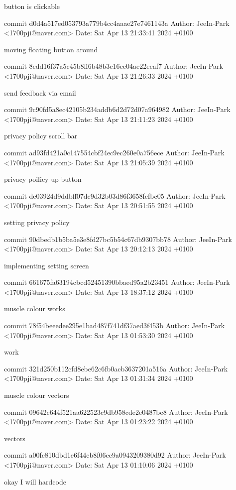    button is clickable

commit d0d4a517ed053793a779b4cc4aaae27e7461143a
Author: JeeIn-Park <1700pji@naver.com>
Date:   Sat Apr 13 21:33:41 2024 +0100

    moving floating button around

commit 8cdd16f37a5c45b8ff6b48b3c16ec04ae22ecaf7
Author: JeeIn-Park <1700pji@naver.com>
Date:   Sat Apr 13 21:26:33 2024 +0100

    send feedback via email

commit 9c90fd5a8ec42105b234addb6d2d72d07a964982
Author: JeeIn-Park <1700pji@naver.com>
Date:   Sat Apr 13 21:11:23 2024 +0100

    privacy policy scroll bar

commit ad93fd421a0c147554cbf24ec9ec260e0a756ece
Author: JeeIn-Park <1700pji@naver.com>
Date:   Sat Apr 13 21:05:39 2024 +0100

    privacy poilicy up button

commit de03924d9ddbff07dc9d32b03d86f3658fcfbc05
Author: JeeIn-Park <1700pji@naver.com>
Date:   Sat Apr 13 20:51:55 2024 +0100

    setting privacy policy

commit 90dbedb1b5ba5e3e8fd27bc5b54c67db9307bb78
Author: JeeIn-Park <1700pji@naver.com>
Date:   Sat Apr 13 20:12:13 2024 +0100

    implementing setting screen

commit 661675fa63194cbcd52451390bbaed95a2b23451
Author: JeeIn-Park <1700pji@naver.com>
Date:   Sat Apr 13 18:37:12 2024 +0100

    muscle colour works

commit 78f54beeedee295e1bad487f741df37aed3f453b
Author: JeeIn-Park <1700pji@naver.com>
Date:   Sat Apr 13 01:53:30 2024 +0100

    work

commit 321d250b112cfd8ebe62c6fb0acb3637201a516a
Author: JeeIn-Park <1700pji@naver.com>
Date:   Sat Apr 13 01:31:34 2024 +0100

    muscle colour vectors

commit 09642c644f521aa622523c9db958cde2e0487be8
Author: JeeIn-Park <1700pji@naver.com>
Date:   Sat Apr 13 01:23:22 2024 +0100

    vectors

commit a00fc810dbd1e6f44cb8f06ec9a0943209380d92
Author: JeeIn-Park <1700pji@naver.com>
Date:   Sat Apr 13 01:10:06 2024 +0100

    okay I will hardcode

